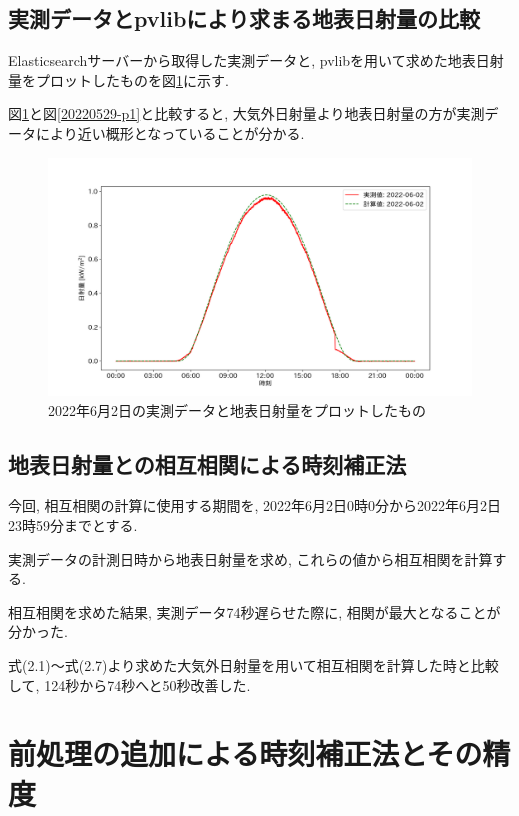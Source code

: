\subsection{実測データとpvlibにより求まる地表日射量の比較}
Elasticsearchサーバーから取得した実測データと, pvlibを用いて求めた地表日射量をプロットしたものを図\ref{2-p1}に示す.

図\ref{2-p1}と図\ref{20220529-p1}と比較すると, 大気外日射量より地表日射量の方が実測データにより近い概形となっていることが分かる.

\begin{figure}[h]
  \begin{center}
    \includegraphics[width=160mm]{sotu/figure/2/pvlib-20220602-corr.png}
    \caption{2022年6月2日の実測データと地表日射量をプロットしたもの}
    \label{2-p1}
  \end{center}
\end{figure}

\subsection{地表日射量との相互相関による時刻補正法}
今回, 相互相関の計算に使用する期間を, 2022年6月2日0時0分から2022年6月2日23時59分までとする.

実測データの計測日時から地表日射量を求め, これらの値から相互相関を計算する.

相互相関を求めた結果, 実測データ74秒遅らせた際に, 相関が最大となることが分かった.

式(2.1)～式(2.7)より求めた大気外日射量を用いて相互相関を計算した時と比較して, 124秒から74秒へと50秒改善した.

\section{前処理の追加による時刻補正法とその精度}

